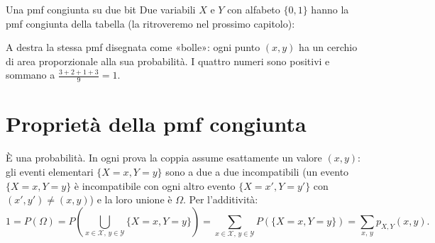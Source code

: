\begin{esempio}{Una pmf congiunta su due bit}
Due variabili $X$ e $Y$ con alfabeto $\{0, 1\}$ hanno la pmf congiunta della tabella (la ritroveremo nel prossimo
capitolo):
\begin{center}
\end{center}
A destra la stessa pmf disegnata come «bolle»: ogni punto $(x, y)$ ha un cerchio di area proporzionale alla sua
probabilità. I quattro numeri sono positivi e sommano a $\frac{3 + 2 + 1 + 3}{9} = 1$.
\end{esempio}

\section{Proprietà della pmf congiunta}


\begin{dimostrazione}
 È una probabilità.
 In ogni prova la coppia assume esattamente un valore $(x, y)$: gli eventi elementari
$\{X = x, Y = y\}$ sono a due a due incompatibili (un evento $\{X = x, Y = y\}$ è incompatibile con ogni altro evento
$\{X = x', Y = y'\}$ con $(x', y') \neq (x, y)$) e la loro unione è $\Omega$. Per l'additività:
\[ 1 = P(\Omega) = P\left( \bigcup_{x \in \mathcal{X},\, y \in \mathcal{Y}} \{X = x, Y = y\} \right)
     = \sum_{x \in \mathcal{X},\, y \in \mathcal{Y}} P(\{X = x, Y = y\}) = \sum_{x,\, y} p_{X,Y}(x, y) . \]
\end{dimostrazione}

